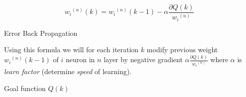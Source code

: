 \begin{mycapequ}[!ht]
    $$ {w_i}^{(n)}(k) = {w_i}^{(n)}(k-1)-\alpha\frac{\partial Q(k)}{{w_i}^{(n)}} $$
    \caption{Error Back Propagation}
    \label{formula:EBP}
\end{mycapequ}

Using this formula we will for each iteration $k$ modify previous weight ${w_i}^{(n)}(k-1)$ of $i$ neuron in $n$ layer by negative gradient $\displaystyle{\alpha\frac{\partial Q(k)}{{w_i}^{(n)}}}$ where $\alpha$ is \textit{learn factor} (determine \textit{speed} of learning).

Goal function $Q(k)$ 
